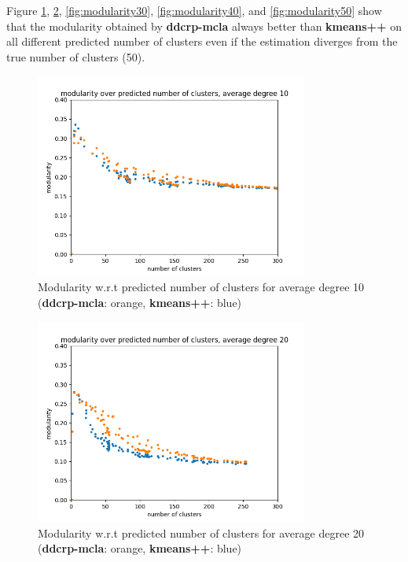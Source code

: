 Figure \ref{fig:modularity10}, \ref{fig:modularity20}, \ref{fig:modularity30}, \ref{fig:modularity40}, and \ref{fig:modularity50} show that the modularity obtained by \textbf{ddcrp-mcla} always better than \textbf{kmeans++} on all different predicted number of clusters even if the estimation diverges from the true number of clusters (50).

\begin{figure}
    \centering
    \includegraphics[width=0.8\textwidth]{report/assets/results/modularity10.png}
    \caption{Modularity w.r.t predicted number of clusters for average degree 10 (\textbf{ddcrp-mcla}: orange, \textbf{kmeans++}: blue)}
    \label{fig:modularity10}
\end{figure}

\begin{figure}
    \centering
    \includegraphics[width=0.8\textwidth]{report/assets/results/modularity20.png}
    \caption{Modularity w.r.t predicted number of clusters for average degree 20 (\textbf{ddcrp-mcla}: orange, \textbf{kmeans++}: blue)}
    \label{fig:modularity20}
\end{figure}

